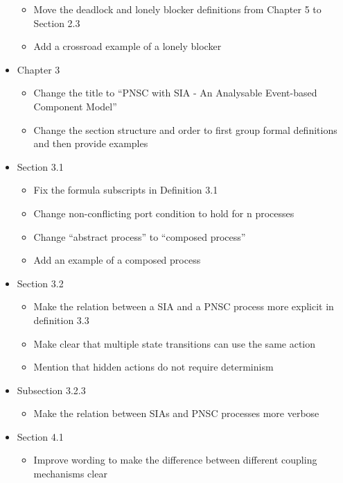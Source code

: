 \documentclass{article}
\begin{document}
\begin{itemize}
        \begin{itemize}
            \item Move the deadlock and lonely blocker definitions from Chapter 5 to Section 2.3
            \item Add a crossroad example of a lonely blocker
        \end{itemize}
    \item Chapter 3
        \begin{itemize}
            \item Change the title to ``PNSC with SIA - An Analysable Event-based Component Model''
            \item Change the section structure and order to first group formal definitions and then provide examples
        \end{itemize}
    \item Section 3.1
        \begin{itemize}
            \item Fix the formula subscripts in Definition 3.1
            \item Change non-conflicting port condition to hold for n processes
            \item Change ``abstract process'' to ``composed process''
            \item Add an example of a composed process
        \end{itemize}
    \item Section 3.2
        \begin{itemize}
            \item Make the relation between a SIA and a PNSC process more explicit in definition 3.3
            \item Make clear that multiple state transitions can use the same action
            \item Mention that hidden actions do not require determinism
        \end{itemize}
    \item Subsection 3.2.3
        \begin{itemize}
            \item Make the relation between SIAs and PNSC processes more verbose
        \end{itemize}
    \item Section 4.1
        \begin{itemize}
            \item Improve wording to make the difference between different coupling mechanisms clear

\end{itemize}
\end{itemize}
\end{document}
